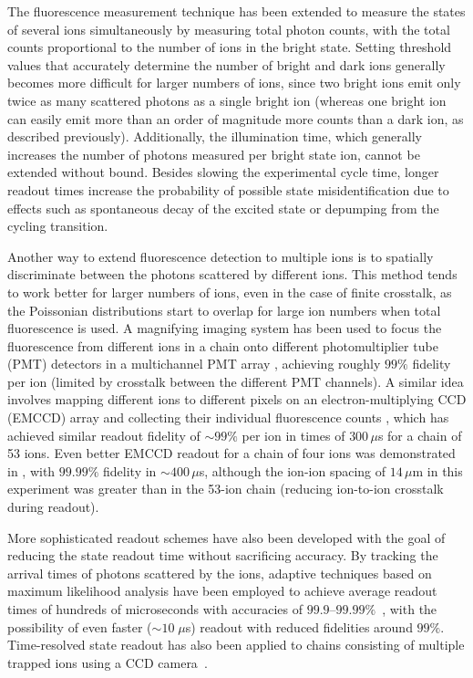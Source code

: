 \documentclass[%
reprint,
 amsmath,amssymb,
]{revtex4-1}
\begin{document}
The fluorescence measurement technique has been extended to measure the states of several ions simultaneously by measuring total photon counts, with the total counts proportional to the number of ions in the bright state. Setting threshold values that accurately determine the number of bright and dark ions generally becomes more difficult for larger numbers of ions, since two bright ions emit only twice as many scattered photons as a single bright ion (whereas one bright ion can easily emit more than an order of magnitude more counts than a dark ion, as described previously). Additionally, the illumination time, which generally increases the number of photons measured per bright state ion, cannot be extended without bound. Besides slowing the experimental cycle time, longer readout times increase the probability of possible state misidentification due to effects such as spontaneous decay of the excited state or depumping from the cycling transition.

Another way to extend fluorescence detection to multiple ions is to spatially discriminate between the photons scattered by different ions. This method tends to work better for larger numbers of ions, even in the case of finite crosstalk, as the Poissonian distributions start to overlap for large ion numbers when total fluorescence is used. A magnifying imaging system has been used to focus the fluorescence from different ions in a chain onto different photomultiplier tube (PMT) detectors in a multichannel PMT array \cite{Debnath5QubitComp2016}, achieving roughly $99 \%$ fidelity per ion (limited by crosstalk between the different PMT channels). A similar idea involves mapping different ions to different pixels on an electron-multiplying CCD (EMCCD) array and collecting their individual fluorescence counts \cite{Zhang53IonSim2017}, which has achieved similar readout fidelity of $\sim 99\%$ per ion in times of $300 \, \mu$s for a chain of 53 ions. Even better EMCCD readout for a chain of four ions was demonstrated in \cite{BurrellMultiqubit2010}, with $99.99 \%$ fidelity in $\sim 400 \, \mu$s, although the ion-ion spacing of $14 \, \mu$m in this experiment was greater than in the 53-ion chain (reducing ion-to-ion crosstalk during readout).

More sophisticated readout schemes have also been developed with the goal of reducing the state readout time without sacrificing accuracy. By tracking the arrival times of photons scattered by the ions, adaptive techniques based on maximum likelihood analysis have been employed to achieve average readout times of hundreds of microseconds with accuracies of $99.9$--$99.99 \%$~\cite{MyersonReadoutIons2008,noek2013high,HartyHighFidelityIons2014}, with the possibility of even faster ($\sim10 \; \mu$s) readout with reduced fidelities around $99 \%$. Time-resolved state readout has also been applied to chains consisting of multiple trapped ions using a CCD camera~\cite{BurrellMultiqubit2010}.
\end{document}
